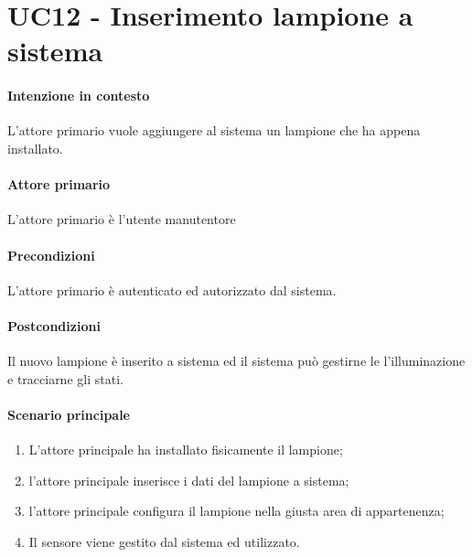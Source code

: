 \section{UC12 - Inserimento lampione a sistema}\label{uc:12}

\paragraph{Intenzione in contesto} L'attore primario vuole aggiungere al sistema un lampione che ha appena installato.

\paragraph{Attore primario} L'attore primario è l'utente manutentore

\paragraph{Precondizioni} L'attore primario è autenticato ed autorizzato dal sistema.

\paragraph{Postcondizioni} Il nuovo lampione è inserito a sistema ed il sistema può gestirne le l'illuminazione e tracciarne gli stati.

\paragraph{Scenario principale}

\begin{enumerate}
    \item L'attore principale ha installato fisicamente il lampione;
    \item l'attore principale inserisce i dati del lampione a sistema;
    \item l'attore principale configura il lampione nella giusta area di appartenenza;
    \item Il sensore viene gestito dal sistema ed utilizzato.
\end{enumerate}
